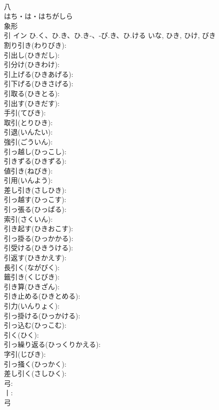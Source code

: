 \documentclass[8pt]{extreport}
\begin{document}
\begin{CJK}{UTF8}{min}
\\	八	
\\	はち・は・はちがしら	
\\	象形 
\\	引	イン	ひ.く、ひ.き、ひ.き-、-び.き、ひ.ける	いな, ひき, ひけ, びき	
\\	割り引き(わりびき): 
\\	引出し(ひきだし): 
\\	引分け(ひきわけ): 
\\	引上げる(ひきあげる): 
\\	引下げる(ひきさげる): 
\\	引取る(ひきとる): 
\\	引出す(ひきだす): 
\\	手引(てびき): 
\\	取引(とりひき): 
\\	引退(いんたい): 
\\	強引(ごういん): 
\\	引っ越し(ひっこし): 
\\	引きずる(ひきずる): 
\\	値引き(ねびき): 
\\	引用(いんよう): 
\\	差し引き(さしひき): 
\\	引っ越す(ひっこす): 
\\	引っ張る(ひっぱる): 
\\	索引(さくいん): 
\\	引き起す(ひきおこす): 
\\	引っ掛る(ひっかかる): 
\\	引受ける(ひきうける): 
\\	引返す(ひきかえす): 
\\	長引く(ながびく): 
\\	籤引き(くじびき): 
\\	引き算(ひきざん): 
\\	引き止める(ひきとめる): 
\\	引力(いんりょく): 
\\	引っ掛ける(ひっかける): 
\\	引っ込む(ひっこむ): 
\\	引く(ひく): 
\\	引っ繰り返る(ひっくりかえる): 
\\	字引(じびき): 
\\	引っ掻く(ひっかく): 
\\	差し引く(さしひく): 
\\	弓: 
\\	丨: 
\\	弓	

\end{CJK}
\end{document}
